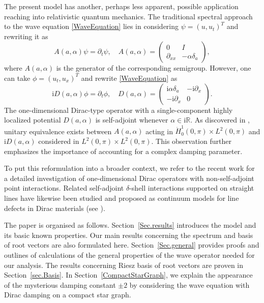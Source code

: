 \documentclass[11pt, a4paper,reqno]{amsart}
\theoremstyle{plain}
\theoremstyle{definition}
\theoremstyle{remark}
\newcommand{\1}{\mathds 1}
\begin{document}
The present model has another, perhaps less apparent, possible application reaching into relativistic quantum mechanics. The traditional spectral approach to the wave equation \eqref{WaveEquation} lies in considering $\psi = (u, u_t)^T $ and rewriting it as
\[
A(a, \alpha)\psi = \partial_t\psi, \quad A(a, \alpha) = \begin{pmatrix}
    0 & I \\ \partial_{xx} & -\alpha\delta_a
\end{pmatrix},
\]
where $A(a,\alpha)$ is the generator of the corresponding semigroup. However, one can take $\phi = (u_t, u_x)^T$ and rewrite \eqref{WaveEquation} as 
\[
\mathrm i D(a, \alpha)\phi = \partial_t\phi, \quad D(a, \alpha) = \begin{pmatrix}
    \mathrm {i}\alpha\delta_a & -\mathrm{i}\partial_x \\
    -\mathrm{i}\partial_x & 0
\end{pmatrix}.
\]
The one-dimensional Dirac-type operator with a single-component highly localized potential $D(a,\alpha)$ is self-adjoint whenever $\alpha \in \mathrm{i}\mathbb R$. As discovered in \cite{Gesztesy1, Gesztesy2}, unitary equivalence exists between $A(a, \alpha)$ acting in $\dot H_0^1(0, \pi) \times L^2(0, \pi)$ and $\mathrm{i}D(a, \alpha)$ considered in $L^2(0,\pi) \times L^2(0, \pi)$. This observation  further emphasizes the importance of accounting for a complex damping parameter.

To put this reformulation into a broader context, we refer to the recent work \cite{HeribanTušek} for a detailed investigation of one-dimensional Dirac operators with non-self-adjoint point interactions. Related self-adjoint $\delta$-shell interactions supported on straight lines have likewise been studied and proposed as continuum models for line defects in Dirac materials (see \cite{BHT}).

The paper is organised as follows. Section~\ref{Sec.results} introduces the model and its basic known properties. Our main results concerning the spectrum and basis of root vectors are also formulated here. Section~\ref{Sec.general} provides proofs and outlines of calculations of the general properties of the wave operator needed for our analysis. The results concerning Riesz basis of root vectors are proven in Section~\ref{sec.Basis}. In Section~\ref{CompactStarGraph}, we explain the appearance of the mysterious damping constant $\pm 2$ by considering the wave equation with Dirac damping on a compact star graph.
 
\end{document}
